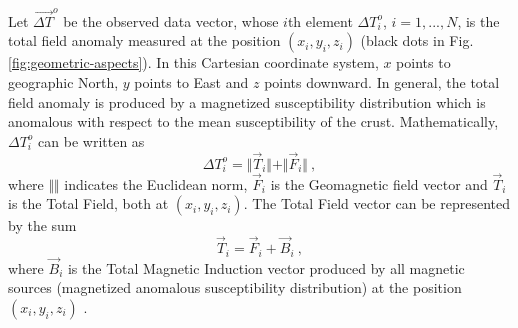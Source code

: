 \documentclass[journal abbreviation, npg]{copernicus}
\begin{document}
Let $\vec{\Delta T}^{o}$ be the observed data vector, whose $i$th element $\Delta T^{o}_{i}$, $i = 1, ..., N$, is the total field anomaly measured at the position $(x_{i}, y_{i}, z_{i})$ (black dots in Fig. \ref{fig:geometric-aspects}). In this Cartesian coordinate system, $x$ points to geographic North, $y$ points to East and $z$ points downward. In general, the total field anomaly is produced by a magnetized  susceptibility distribution which is anomalous with respect to the mean susceptibility of the crust. Mathematically, $\Delta T^{o}_{i}$ can be written as
\begin{equation}
\Delta T^{o}_{i} = \Vert \vec{T}_i \Vert + \Vert \vec{F}_i \Vert \: ,
\label{eq:tfanomaly-i}
\end{equation}
where $\Vert \Vert$ indicates the Euclidean norm, $\vec{F}_i$ is the Geomagnetic field vector and $\vec{T}_i$ is the Total Field, both at $(x_{i}, y_{i}, z_{i})$. The Total Field vector can be represented by the sum
\begin{equation}
\vec{T}_i = \vec{F}_i + \vec{B}_i \: ,
\label{eq:tfvector-i}
\end{equation}
where $\vec{B}_i$ is the Total Magnetic Induction vector produced by all magnetic sources (magnetized anomalous susceptibility distribution) at the position $(x_{i}, y_{i}, z_{i})$ \citep{blakely1996, langel-hinze1998}.
\end{document}
